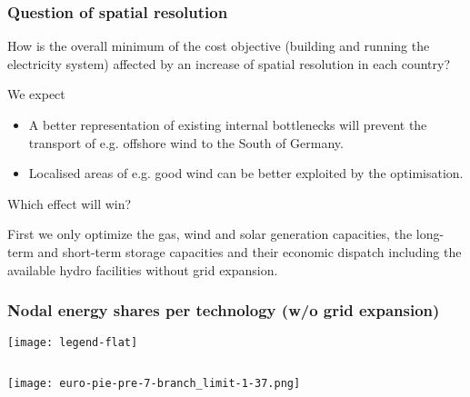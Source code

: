 \documentclass[10pt,aspectratio=169,dvipsnames]{beamer}
\let\olditem\item
\renewcommand{\item}{%
\olditem\vspace{5pt}}
\begin{document}
\begin{frame}
  \frametitle{Question of spatial resolution}

  How is the overall minimum of the cost objective (building and
  running the electricity system) affected by an increase of spatial
  resolution in each country?

  We expect
  \begin{itemize}
  \item A better representation of existing internal bottlenecks will prevent the transport of e.g. offshore wind to the South of Germany.
  \item Localised areas of e.g. good wind can be better exploited by the optimisation.
  \end{itemize}

  Which effect will win?

  First we only optimize the gas, wind and solar generation
  capacities, the long-term and short-term storage capacities and
  their economic dispatch including the available hydro facilities
  \alert{without grid expansion}.
\end{frame}



\begin{frame}
  \frametitle{Nodal energy shares per technology (w/o grid expansion)}

\texttt{[image: legend-flat]}
\begin{columns}[T]
\begin{column}{8cm}


  \texttt{[image: euro-pie-pre-7-branch\_limit-1-37.png]}

\end{column}
\begin{column}{8cm}


\end{column}

\end{columns}


\end{frame}
\end{document}
